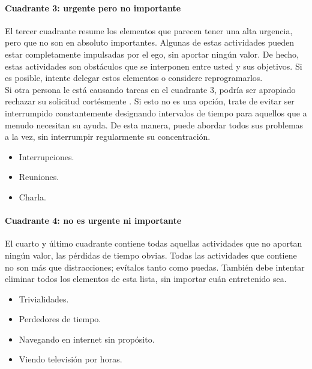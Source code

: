 \documentclass[10pt]{book}
\begin{document}
\paragraph{Cuadrante 3: urgente pero no importante}
El tercer cuadrante resume los elementos que parecen tener una alta urgencia, pero que no son en absoluto importantes. Algunas de estas actividades pueden estar completamente impulsadas por el ego, sin aportar ningún valor. De hecho, estas actividades son obstáculos que se interponen entre usted y sus objetivos. Si es posible, intente delegar estos elementos o considere reprogramarlos.\\
Si otra persona le está causando tareas en el cuadrante 3, podría ser apropiado rechazar su solicitud cortésmente . Si esto no es una opción, trate de evitar ser interrumpido constantemente designando intervalos de tiempo para aquellos que a menudo necesitan su ayuda. De esta manera, puede abordar todos sus problemas a la vez, sin interrumpir regularmente su concentración.
\begin{center}
\begin{itemize}
\item Interrupciones.
\item Reuniones.
\item Charla.
\end{itemize}
\end{center}
\paragraph{Cuadrante 4: no es urgente ni importante}
El cuarto y último cuadrante contiene todas aquellas actividades que no aportan ningún valor, las pérdidas de tiempo obvias. Todas las actividades que contiene no son más que distracciones; evítalos tanto como puedas. También debe intentar eliminar todos los elementos de esta lista, sin importar cuán entretenido sea.
\begin{center}
\begin{itemize}
\item Trivialidades.
\item Perdedores de tiempo.
\item Navegando en internet sin propósito.
\item Viendo televisión por horas.
\end{itemize}
\end{center}
\end{document}
